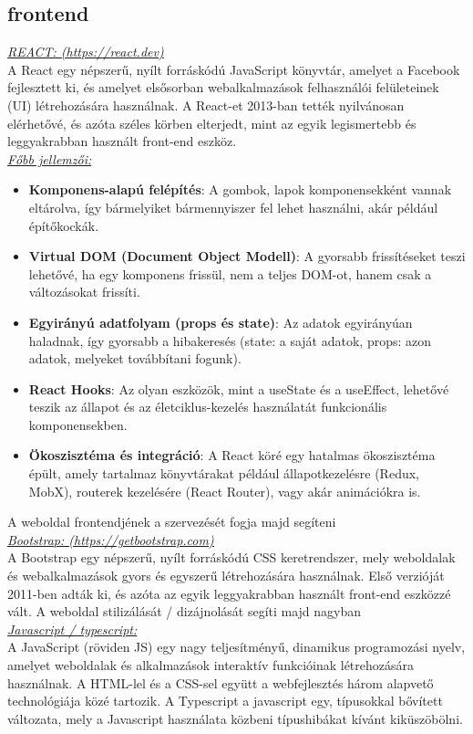 \documentclass[a4paper,12pt]{article}
\begin{document}
\subsection{frontend}
\textit{\underline{REACT: (\url{https://react.dev)}}}
\\A React egy népszerű, nyílt forráskódú JavaScript könyvtár, amelyet a Facebook fejlesztett ki, és amelyet elsősorban webalkalmazások felhasználói felületeinek (UI) létrehozására használnak. A React-et 2013-ban tették nyilvánosan elérhetővé, és azóta széles körben elterjedt, mint az egyik legismertebb és leggyakrabban használt front-end eszköz.\bigskip
\\\textit{\underline{Főbb jellemzői:}}
\begin{itemize}
    \item \textbf{Komponens-alapú felépítés}: A gombok, lapok komponensekként vannak eltárolva, így bármelyiket bármennyiszer fel lehet használni, akár például építőkockák.
    \item \textbf{Virtual DOM (Document Object Modell)}: A gyorsabb frissítéseket teszi lehetővé, ha egy komponens frissül, nem a teljes DOM-ot, hanem csak a változásokat frissíti.
    \item \textbf{Egyirányú adatfolyam (props és state)}: Az adatok egyirányúan haladnak, így gyorsabb a hibakeresés (state: a saját adatok, props: azon adatok, melyeket továbbítani fogunk).
    \item \textbf{React Hooks}: Az olyan eszközök, mint a useState és a useEffect, lehetővé teszik az állapot és az életciklus-kezelés használatát funkcionális komponensekben.
    \item \textbf{Ökoszisztéma és integráció}: A React köré egy hatalmas ökoszisztéma épült, amely tartalmaz könyvtárakat például állapotkezelésre (Redux, MobX), routerek kezelésére (React Router), vagy akár animációkra is.
\end{itemize}
A weboldal frontendjének a szervezését fogja majd segíteni\bigskip
\\\textit{\underline{Bootstrap: (\url{https://getbootstrap.com)}}}
\\A Bootstrap egy népszerű, nyílt forráskódú CSS keretrendszer, mely weboldalak és webalkalmazások gyors és egyszerű létrehozására használnak. Első verzióját 2011-ben adták ki, és azóta az egyik leggyakrabban használt front-end eszközzé vált. A weboldal stilizálását / dizájnolását segíti majd nagyban\bigskip
\\\textit{\underline{Javascript / typescript:}}
\\A JavaScript (röviden JS) egy nagy teljesítményű, dinamikus programozási nyelv, amelyet weboldalak és alkalmazások interaktív funkcióinak létrehozására használnak. A HTML-lel és a CSS-sel együtt a webfejlesztés három alapvető technológiája közé tartozik. A Typescript a javascript egy, típusokkal bővített változata, mely a Javascript használata közbeni típushibákat kívánt kiküszöbölni.
\end{document}
